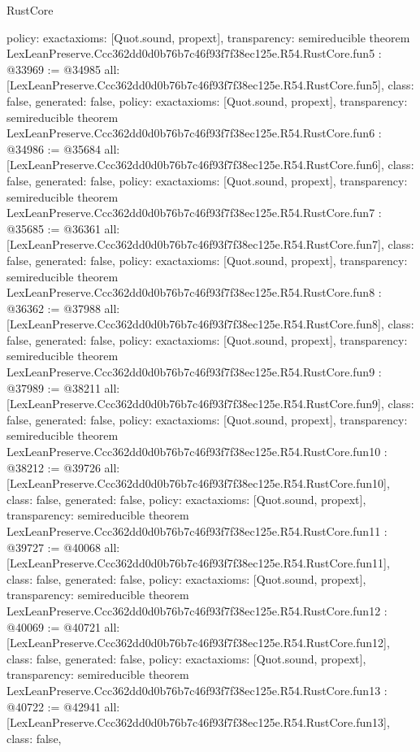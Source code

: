 \begin{lexlean}{RustCore}
\begin{coremodule}
{  policy: exact{axioms: [Quot.sound, propext]},
  transparency: semireducible
}
theorem LexLeanPreserve.Ccc362dd0d0b76b7c46f93f7f38ec125e.R54.RustCore.fun5 : @33969 := @34985 {
  all: [LexLeanPreserve.Ccc362dd0d0b76b7c46f93f7f38ec125e.R54.RustCore.fun5],
  class: false,
  generated: false,
  policy: exact{axioms: [Quot.sound, propext]},
  transparency: semireducible
}
theorem LexLeanPreserve.Ccc362dd0d0b76b7c46f93f7f38ec125e.R54.RustCore.fun6 : @34986 := @35684 {
  all: [LexLeanPreserve.Ccc362dd0d0b76b7c46f93f7f38ec125e.R54.RustCore.fun6],
  class: false,
  generated: false,
  policy: exact{axioms: [Quot.sound, propext]},
  transparency: semireducible
}
theorem LexLeanPreserve.Ccc362dd0d0b76b7c46f93f7f38ec125e.R54.RustCore.fun7 : @35685 := @36361 {
  all: [LexLeanPreserve.Ccc362dd0d0b76b7c46f93f7f38ec125e.R54.RustCore.fun7],
  class: false,
  generated: false,
  policy: exact{axioms: [Quot.sound, propext]},
  transparency: semireducible
}
theorem LexLeanPreserve.Ccc362dd0d0b76b7c46f93f7f38ec125e.R54.RustCore.fun8 : @36362 := @37988 {
  all: [LexLeanPreserve.Ccc362dd0d0b76b7c46f93f7f38ec125e.R54.RustCore.fun8],
  class: false,
  generated: false,
  policy: exact{axioms: [Quot.sound, propext]},
  transparency: semireducible
}
theorem LexLeanPreserve.Ccc362dd0d0b76b7c46f93f7f38ec125e.R54.RustCore.fun9 : @37989 := @38211 {
  all: [LexLeanPreserve.Ccc362dd0d0b76b7c46f93f7f38ec125e.R54.RustCore.fun9],
  class: false,
  generated: false,
  policy: exact{axioms: [Quot.sound, propext]},
  transparency: semireducible
}
theorem LexLeanPreserve.Ccc362dd0d0b76b7c46f93f7f38ec125e.R54.RustCore.fun10 : @38212 := @39726 {
  all: [LexLeanPreserve.Ccc362dd0d0b76b7c46f93f7f38ec125e.R54.RustCore.fun10],
  class: false,
  generated: false,
  policy: exact{axioms: [Quot.sound, propext]},
  transparency: semireducible
}
theorem LexLeanPreserve.Ccc362dd0d0b76b7c46f93f7f38ec125e.R54.RustCore.fun11 : @39727 := @40068 {
  all: [LexLeanPreserve.Ccc362dd0d0b76b7c46f93f7f38ec125e.R54.RustCore.fun11],
  class: false,
  generated: false,
  policy: exact{axioms: [Quot.sound, propext]},
  transparency: semireducible
}
theorem LexLeanPreserve.Ccc362dd0d0b76b7c46f93f7f38ec125e.R54.RustCore.fun12 : @40069 := @40721 {
  all: [LexLeanPreserve.Ccc362dd0d0b76b7c46f93f7f38ec125e.R54.RustCore.fun12],
  class: false,
  generated: false,
  policy: exact{axioms: [Quot.sound, propext]},
  transparency: semireducible
}
theorem LexLeanPreserve.Ccc362dd0d0b76b7c46f93f7f38ec125e.R54.RustCore.fun13 : @40722 := @42941 {
  all: [LexLeanPreserve.Ccc362dd0d0b76b7c46f93f7f38ec125e.R54.RustCore.fun13],
  class: false,
}
\end{coremodule}
\end{lexlean}
